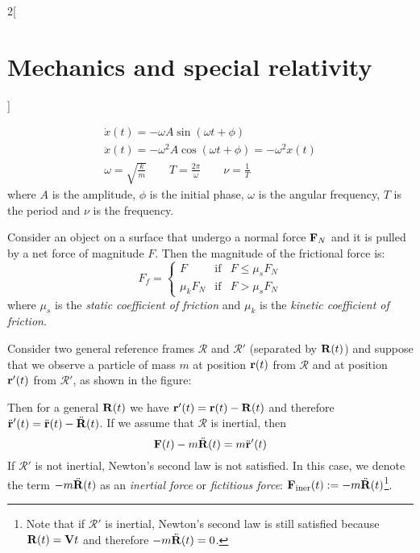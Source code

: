 \documentclass[../../../main.tex]{subfiles}
\begin{document}
\begin{multicols}{2}[\section{Mechanics and special relativity}]
\begin{proposition}
\begin{gather*}
      \dot{x}(t)=-\omega A\sin(\omega t+\phi)\\
      \ddot{x}(t)=-\omega^2 A\cos(\omega t+\phi)=-\omega^2x(t)\\
      \omega=\sqrt{\frac{k}{m}}\qquad T=\frac{2\pi}{\omega}\qquad\nu=\frac{1}{T}
    \end{gather*}
    where $A$ is the amplitude, $\phi$ is the initial phase, $\omega$ is the angular frequency, $T$ is the period and $\nu$ is the frequency.
  \end{proposition}
  \begin{proposition}
    Consider an object on a surface that undergo a normal force $\boldsymbol{\mathrm{F}}_N$ and it is pulled by a net force of magnitude $F$. Then the magnitude of the frictional force is:
    $$
      F_f=\left\{
      \begin{array}{rcl}
        F        & \text{if} & F\leq\mu_sF_N \\
        \mu_kF_N & \text{if} & F>\mu_sF_N
      \end{array}\right.
    $$
    where $\mu_s$ is the \emph{static coefficient of friction} and $\mu_k$ is the \emph{kinetic coefficient of friction}.
  \end{proposition}
  \begin{proposition}
    Consider two general reference frames $\mathcal{R}$ and $\mathcal{R}'$ (separated by $\boldsymbol{\mathrm{R}}(t)$) and suppose that we observe a particle of mass $m$ at position $\boldsymbol{\mathrm{r}}(t)$ from $\mathcal{R}$ and at position $\boldsymbol{\mathrm{r}}'(t)$ from $\mathcal{R}'$, as shown in the figure:
    \begin{center}
      \begin{minipage}{\linewidth}
        \centering
        
      \end{minipage}
    \end{center}
    Then for a general $\boldsymbol{\mathrm{R}}(t)$ we have $\boldsymbol{\mathrm{r}}'(t)=\boldsymbol{\mathrm{r}}(t)-\boldsymbol{\mathrm{R}}(t)$ and therefore $\ddot{\boldsymbol{\mathrm{r}}}'(t)=\ddot{\boldsymbol{\mathrm{r}}}(t)-\ddot{\boldsymbol{\mathrm{R}}}(t)$. If we assume that $\mathcal{R}$ is inertial, then $$\boldsymbol{\mathrm{F}}(t)-m\ddot{\boldsymbol{\mathrm{R}}}(t)=m\ddot{\boldsymbol{\mathrm{r}}}'(t)$$ If $\mathcal{R}'$ is not inertial, Newton's second law is not satisfied. In this case, we denote the term $-m\ddot{\boldsymbol{\mathrm{R}}}(t)$ as an \emph{inertial force} or \emph{fictitious force}: $\boldsymbol{\mathrm{F}}_\text{iner}(t):=-m\ddot{\boldsymbol{\mathrm{R}}}(t)$\footnote{Note that if $\mathcal{R}'$ is inertial, Newton's second law is still satisfied because $\boldsymbol{\mathrm{R}}(t)=\boldsymbol{\mathrm{V}}t$ and therefore $-m\ddot{\boldsymbol{\mathrm{R}}}(t)=0$.}.

\end{proposition}
\end{multicols}
\end{document}
